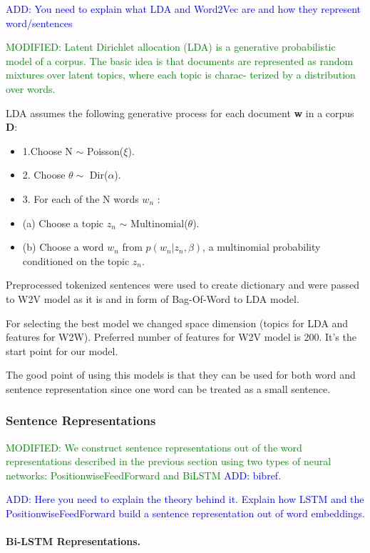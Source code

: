 \documentclass[11pt]{article}
\newcommand\add[1]{{\textcolor{blue}{ADD: #1}}}
\newcommand\mod[1]{{\textcolor{green}{MODIFIED: #1}}}
\begin{document}
\add{You need to explain what LDA and Word2Vec are and how they represent word/sentences}

\mod{Latent Dirichlet allocation (LDA) is a generative probabilistic model of a corpus. The basic idea is
that documents are represented as random mixtures over latent topics, where each topic is charac-
terized by a distribution over words. }

LDA assumes the following generative process for each document \textbf{w} in a corpus \textbf{D}:
\begin{itemize}

\item 1.Choose N $\sim$ Poisson($\xi$).
\item 2.  Choose $\theta \sim$ Dir($\alpha$).
\item 3.  For each of the N words $w_{n}$ :
\item (a)  Choose a topic $z_{n}$ $\sim$ Multinomial($\theta$).
\item (b)  Choose a word $w_{n}$ from $p(w_{n} | z_{n}, \beta)$, a multinomial probability conditioned on the topic $z_{n}$.
\end{itemize}

Preprocessed tokenized sentences were used to create dictionary and were passed to W2V model as it is and in form of Bag-Of-Word to LDA model.

For selecting the best model we changed space dimension (topics for LDA and features for W2W). Preferred number of features for W2V model is 200. It's the start point for our model.

The good point of using this models is that they can be used for both word and sentence representation since one word can be treated as a small sentence.


\subsubsection{Sentence Representations}

\mod{We construct sentence representations out of the word representations described in the previous section using two types of neural networks:  PositionwiseFeedForward \cite{vaswani2017attention} and BiLSTM \add{bibref}}.

\add{Here you need to explain the theory behind it. Explain how LSTM and the PositionwiseFeedForward  build a sentence representation out of word embeddings.}

\paragraph{Bi-LSTM Representations.}
\end{document}
